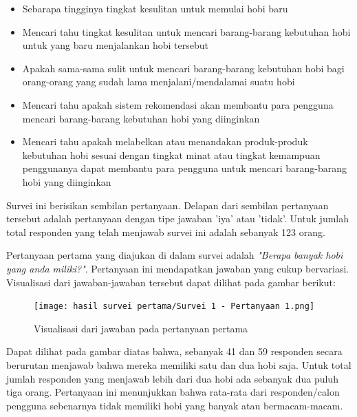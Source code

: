 \documentclass[a4paper]{article}
\begin{document}
\begin{itemize}
    \item Sebarapa tingginya tingkat kesulitan untuk memulai hobi baru
    \item Mencari tahu tingkat kesulitan untuk mencari barang-barang kebutuhan hobi untuk yang baru menjalankan hobi tersebut
    \item Apakah sama-sama sulit untuk mencari barang-barang kebutuhan hobi bagi orang-orang yang sudah lama menjalani/mendalamai suatu hobi
    \item Mencari tahu apakah sistem rekomendasi akan membantu para pengguna mencari barang-barang kebutuhan hobi yang diinginkan
    \item Mencari tahu apakah melabelkan atau menandakan produk-produk kebutuhan hobi sesuai dengan tingkat minat atau tingkat kemampuan penggunanya dapat membantu para pengguna untuk mencari barang-barang hobi yang diinginkan
\end{itemize}

Survei ini berisikan sembilan pertanyaan. Delapan dari sembilan pertanyaan tersebut adalah pertanyaan dengan tipe jawaban 'iya' atau 'tidak'. Untuk jumlah total responden yang telah menjawab survei ini adalah sebanyak 123 orang.

Pertanyaan pertama yang diajukan di dalam survei adalah \textit{"Berapa banyak hobi yang anda miliki?"}. Pertanyaan ini mendapatkan jawaban yang cukup bervariasi. Visualisasi dari jawaban-jawaban tersebut dapat dilihat pada gambar berikut:

\begin{figure}[h]
    \centering
    \texttt{[image: hasil survei pertama/Survei 1 - Pertanyaan 1.png]}
    \caption{Visualisasi dari jawaban pada pertanyaan pertama}
\end{figure}

Dapat dilihat pada gambar diatas bahwa, sebanyak 41 dan 59 responden secara berurutan menjawab bahwa mereka memiliki satu dan dua hobi saja. Untuk total jumlah responden yang menjawab lebih dari dua hobi ada sebanyak dua puluh tiga orang. Pertanyaan ini menunjukkan bahwa rata-rata dari responden/calon pengguna sebenarnya tidak memiliki hobi yang banyak atau bermacam-macam.
\end{document}
